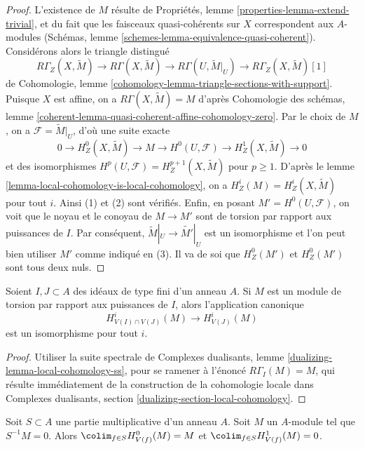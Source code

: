 \begin{proof}
L'existence de $M$ résulte de Propriétés, lemme \ref{properties-lemma-extend-trivial}, et du fait que les faisceaux quasi-cohérents sur $X$ correspondent aux $A$-modules (Schémas, lemme \ref{schemes-lemma-equivalence-quasi-coherent}). Considérons alors le triangle distingué
$$
R\Gamma_Z(X, \widetilde{M}) \to R\Gamma(X, \widetilde{M}) \to
R\Gamma(U, \widetilde{M}|_U) \to R\Gamma_Z(X, \widetilde{M})[1]
$$
de Cohomologie, lemme \ref{cohomology-lemma-triangle-sections-with-support}. Puisque $X$ est affine, on a $R\Gamma(X, \widetilde{M}) = M$ d'après Cohomologie des schémas, lemme \ref{coherent-lemma-quasi-coherent-affine-cohomology-zero}. Par le choix de $M$, on a $\mathcal{F} = \widetilde{M}|_U$, d'où une suite exacte
$$
0 \to H^0_Z(X, \widetilde{M}) \to M \to H^0(U, \mathcal{F}) \to
H^1_Z(X, \widetilde{M}) \to 0
$$
et des isomorphismes $H^p(U, \mathcal{F}) = H^{p + 1}_Z(X, \widetilde{M})$ pour $p \geq 1$. D'après le lemme \ref{lemma-local-cohomology-is-local-cohomology}, on a $H^i_Z(M) = H^i_Z(X, \widetilde{M})$ pour tout $i$. Ainsi (1) et (2) sont vérifiés. Enfin, en posant $M' = H^0(U, \mathcal{F})$, on voit que le noyau et le conoyau de $M \to M'$ sont de torsion par rapport aux puissances de $I$. Par conséquent, $\widetilde{M}|_U \to \widetilde{M'}|_U$ est un isomorphisme et l'on peut bien utiliser $M'$ comme indiqué en (3). Il va de soi que $H^0_Z(M')$ et $H^0_Z(M')$ sont tous deux nuls.
\end{proof}

\begin{lemma}
\label{lemma-already-torsion}
Soient $I, J \subset A$ des idéaux de type fini d'un anneau $A$. Si $M$ est un module de torsion par rapport aux puissances de $I$, alors l'application canonique
$$
H^i_{V(I) \cap V(J)}(M) \to H^i_{V(J)}(M)
$$
est un isomorphisme pour tout $i$.
\end{lemma}

\begin{proof}
Utiliser la suite spectrale de Complexes dualisants, lemme \ref{dualizing-lemma-local-cohomology-ss}, pour se ramener à l'énoncé $R\Gamma_I(M) = M$, qui résulte immédiatement de la construction de la cohomologie locale dans Complexes dualisants, section \ref{dualizing-section-local-cohomology}.
\end{proof}

\begin{lemma}
\label{lemma-multiplicative}
Soit $S \subset A$ une partie multiplicative d'un anneau $A$. Soit $M$ un $A$-module tel que $S^{-1}M = 0$. Alors $\colim_{f \in S} H^0_{V(f)}(M) = M$ et $\colim_{f \in S} H^1_{V(f)}(M) = 0$.
\end{lemma}

